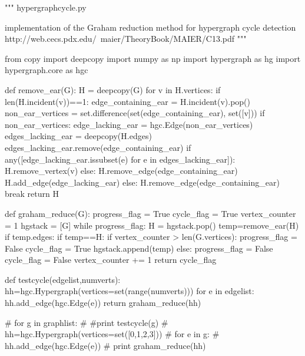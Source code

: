 \begin{python}
"""
hypergraphcycle.py

implementation of the Graham reduction method
for hypergraph cycle detection
http://web.cecs.pdx.edu/~maier/TheoryBook/MAIER/C13.pdf
"""

from copy import deepcopy
import numpy as np
import hypergraph as hg
import hypergraph.core as hgc

def remove_ear(G):
    H = deepcopy(G)
    for v in H.vertices:
        if len(H.incident(v))==1:
            edge_containing_ear = H.incident(v).pop()
            non_ear_vertices = set.difference(set(edge_containing_ear),
                                              set([v]))
            if non_ear_vertices:
                edge_lacking_ear = hgc.Edge(non_ear_vertices)
                edges_lacking_ear = deepcopy(H.edges)
                edges_lacking_ear.remove(edge_containing_ear)
                if any([edge_lacking_ear.issubset(e) for e in edges_lacking_ear]):
                    H.remove_vertex(v)
                else:
                    H.remove_edge(edge_containing_ear)
                    H.add_edge(edge_lacking_ear)
            else:
                H.remove_edge(edge_containing_ear)
            break
    return H

def graham_reduce(G):
    progress_flag = True
    cycle_flag = True
    vertex_counter = 1
    hgstack = [G]
    while progress_flag:
        H = hgstack.pop()
        temp=remove_ear(H)
        if temp.edges:
            if temp==H:
                if vertex_counter > len(G.vertices):
                    progress_flag = False
                    cycle_flag = True
            hgstack.append(temp)
        else:
            progress_flag = False
            cycle_flag = False
        vertex_counter += 1
    return cycle_flag

def testcycle(edgelist,numverts):
    hh=hgc.Hypergraph(vertices=set(range(numverts)))
    for e in edgelist:
        hh.add_edge(hgc.Edge(e))
    return graham_reduce(hh)


# for g in graphlist:
#     #print testcycle(g)
#     hh=hgc.Hypergraph(vertices=set([0,1,2,3]))
#     for e in g:
#         hh.add_edge(hgc.Edge(e))
#     print graham_reduce(hh)
\end{python}
